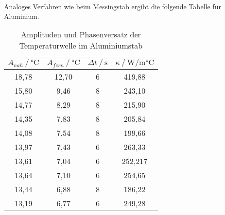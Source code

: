 Analoges Verfahren wie beim Messingstab ergibt die folgende Tabelle für Aluminium.

\begin{table}[H]   
  \centering
  \caption{Amplituden und Phasenversatz der Temperaturwelle im Aluminiumstab}
  \begin{tabular}{cccc}
    \toprule
    {$A_{nah} \mathbin{/} \unit{\degreeCelsius}$} &
    {$A_{fern} \mathbin{/} \unit{\degreeCelsius}$} &    %
    {$\Delta t \mathbin{/} \unit{\second}$} &
    {$\kappa \mathbin{/} \unit{\watt / \milli\degreeCelsius}$} \\
    \midrule
    18,78 & 12,70 & 6 & 419,88 \\
    15,80 &  9,46 & 8 & 243,10 \\
    14,77 &  8,29 & 8 & 215,90 \\   
    14,35 &  7,83 & 8 & 205,84 \\
    14,08 &  7,54 & 8 & 199,66 \\
    13,97 &  7,43 & 6 & 263,33 \\
    13,61 &  7,04 & 6 & 252,217 \\
    13,64 &  7,10 & 6 & 254,65 \\
    13,44 &  6,88 & 8 & 186,22 \\
    13,19 &  6,77 & 6 & 249,28 \\
    
    \bottomrule
  \end{tabular}
  \label{tab:TabelleA4}
\end{table}


